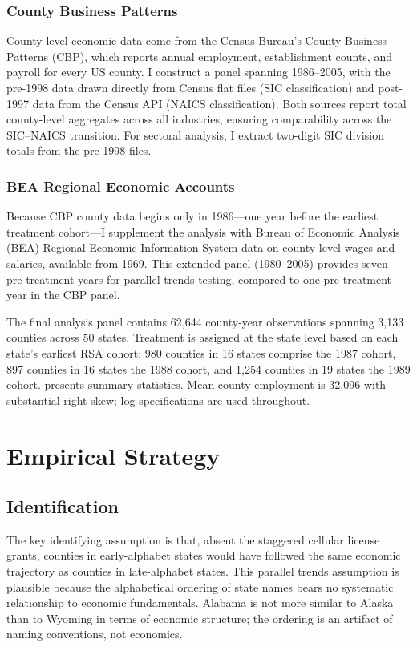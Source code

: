 \documentclass[12pt]{article}
\begin{document}
\subsubsection*{County Business Patterns} County-level economic data come from the Census Bureau's County Business Patterns (CBP), which reports annual employment, establishment counts, and payroll for every US county. I construct a panel spanning 1986--2005, with the pre-1998 data drawn directly from Census flat files (SIC classification) and post-1997 data from the Census API (NAICS classification). Both sources report total county-level aggregates across all industries, ensuring comparability across the SIC--NAICS transition. For sectoral analysis, I extract two-digit SIC division totals from the pre-1998 files.

\subsubsection*{BEA Regional Economic Accounts} Because CBP county data begins only in 1986---one year before the earliest treatment cohort---I supplement the analysis with Bureau of Economic Analysis (BEA) Regional Economic Information System data on county-level wages and salaries, available from 1969. This extended panel (1980--2005) provides seven pre-treatment years for parallel trends testing, compared to one pre-treatment year in the CBP panel.

The final analysis panel contains 62,644 county-year observations spanning 3,133 counties across 50 states. Treatment is assigned at the state level based on each state's earliest RSA cohort: 980 counties in 16 states comprise the 1987 cohort, 897 counties in 16 states the 1988 cohort, and 1,254 counties in 19 states the 1989 cohort.  presents summary statistics. Mean county employment is 32,096 with substantial right skew; log specifications are used throughout.



\section{Empirical Strategy}

\subsection{Identification}

The key identifying assumption is that, absent the staggered cellular license grants, counties in early-alphabet states would have followed the same economic trajectory as counties in late-alphabet states. This parallel trends assumption is plausible because the alphabetical ordering of state names bears no systematic relationship to economic fundamentals. Alabama is not more similar to Alaska than to Wyoming in terms of economic structure; the ordering is an artifact of naming conventions, not economics.
\end{document}
